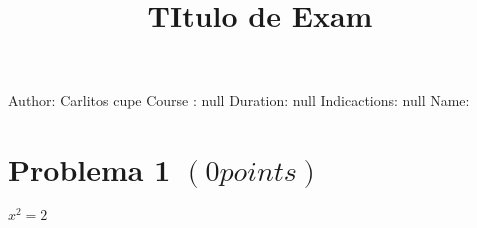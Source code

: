 \documentclass{article}
\title{TItulo de Exam }
\begin{document}
 
\maketitle 
Author: Carlitos cupe \newline 
Course : null$                                              $ Duration: null \newline 
Indicactions: 
 \newline 
null \newline 
Name:  \newline 
\section{ Problema 1 $(0 points)$ } 
$x^2=2$
\end{document}
